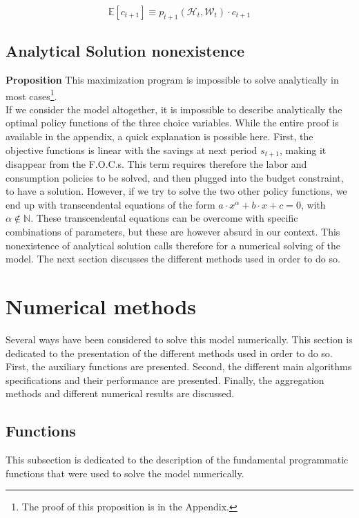 \documentclass{article}
\begin{document}
$$\mathbb{E}\left[c_{t+1}\right] \equiv p_{t+1}(\mathcal{H}_{t},\mathcal{W}_{t}) \cdot c_{t+1}$$

\subsection{Analytical Solution nonexistence}

\textbf{Proposition}
This maximization program is impossible to solve analytically in most cases\footnote{The proof of this proposition is in the Appendix.}.
\\

If we consider the model altogether, it is impossible to describe 
analytically the optimal policy functions of the three choice variables.
While the entire proof is available in the appendix, a quick explanation
is possible here.
First, the objective functions is linear with the savings at next period $s_{t+1}$, 
making it disappear from the F.O.C.s.
This term requires therefore the labor and consumption policies to be solved, 
and then plugged into the budget constraint, to have a solution. 
However, if we try to solve the two other policy functions, 
we end up with transcendental equations of the form $a\cdot x^{\alpha} + b\cdot x + c = 0$, 
with $\alpha\notin \mathbb{N}$. 
These transcendental equations can be overcome with specific combinations 
of parameters, but these are however absurd in our context.
This nonexistence of analytical solution calls therefore for a numerical solving of the model.
The next section discusses the different methods used in order to do so.

\section{Numerical methods}

Several ways have been considered to solve this model numerically. 
This section is dedicated to the presentation of the different methods
used in order to do so. 
First, the auxiliary functions are presented. 
Second, the different main algorithms specifications and their performance are presented. 
Finally, the aggregation methods and different numerical results are discussed.

\subsection{Functions}

This subsection is dedicated to the description of the 
fundamental programmatic functions that were used to solve the model
numerically. 
\end{document}
